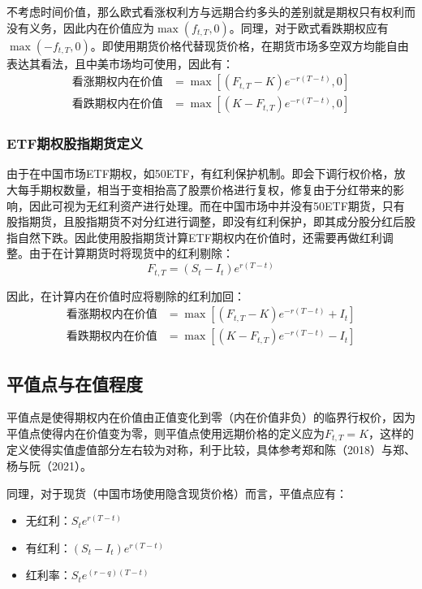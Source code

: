 \documentclass[11pt]{article}
\begin{document}
不考虑时间价值，那么欧式看涨权利方与远期合约多头的差别就是期权只有权利而没有义务，因此内在价值应为$\max(f_{t,T},0)$。同理，对于欧式看跌期权应有$\max(-f_{t,T},0)$。即使用期货价格代替现货价格，在期货市场多空双方均能自由表达其看法，且中美市场均可使用，因此有：
\begin{align*}
    \text{看涨期权内在价值} & = \max\left[(F_{t,T}-K)e^{-r(T-t)},0\right] \\
    \text{看跌期权内在价值} & = \max\left[(K-F_{t,T})e^{-r(T-t)},0\right]
\end{align*}

\subsubsection*{ETF期权股指期货定义}

由于在中国市场ETF期权，如50ETF，有红利保护机制。即会下调行权价格，放大每手期权数量，相当于变相抬高了股票价格进行复权，修复由于分红带来的影响，因此可视为无红利资产进行处理。而在中国市场中并没有50ETF期货，只有股指期货，且股指期货不对分红进行调整，即没有红利保护，即其成分股分红后股指自然下跌。因此使用股指期货计算ETF期权内在价值时，还需要再做红利调整。由于在计算期货时将现货中的红利剔除：
\begin{equation*}
    F_{t,T} = ( S_t - I_t )e^{r(T-t)}
\end{equation*}

因此，在计算内在价值时应将剔除的红利加回：
\begin{align*}
    \text{看涨期权内在价值} & = \max\left[ (F_{t,T}-K) e^{-r(T-t)} + I_t \right] \\
    \text{看跌期权内在价值} & = \max\left[ (K-F_{t,T}) e^{-r(T-t)} - I_t \right]
\end{align*}

\subsection{平值点与在值程度}

平值点是使得期权内在价值由正值变化到零（内在价值非负）的临界行权价，因为平值点使得内在价值变为零，则平值点使用远期价格的定义应为$F_{t,T}=K$，这样的定义使得实值虚值部分左右较为对称，利于比较，具体参考郑和陈（2018）与郑、杨与阮（2021）。

同理，对于现货（中国市场使用隐含现货价格）而言，平值点应有：
\begin{itemize}
    \item 无红利：$S_t e^{r(T-t)}$
    \item 有红利：$\left(S_t - I_t \right)e^{r(T-t)} $
    \item 红利率：$S_t e^{(r-q)(T-t)}$
\end{itemize}
\end{document}
